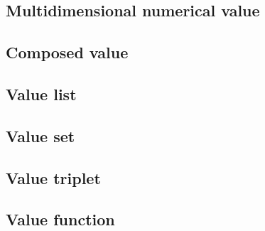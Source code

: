 \documentclass[a4,12pt]{article}
\begin{document}
\subsection*{Multidimensional numerical value} 

\subsection*{Composed value} 

\subsection*{Value list} 

\subsection*{Value set} 

\subsection*{Value triplet} 

\subsection*{Value function} 

\fi

{\scriptsize  }

\end{document}

